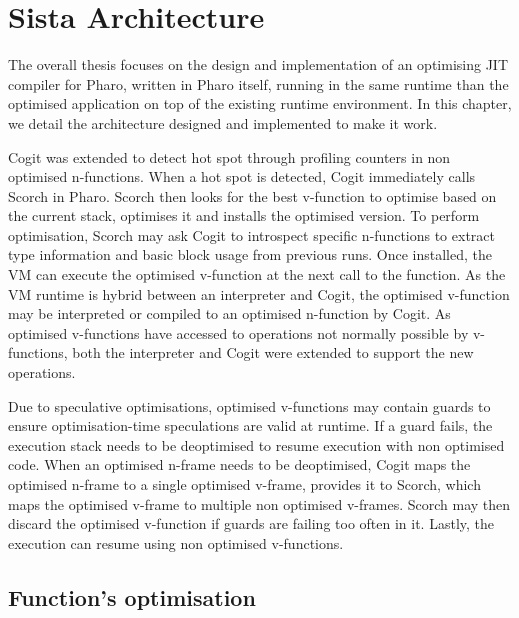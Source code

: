 \documentclass[a4paper,12pt,twoside]{../includes/ThesisStyle}
\begin{document}
\fi

\chapter{Sista Architecture}
\label{chap:architecture}
\minitoc

The overall thesis focuses on the design and implementation of an optimising JIT compiler for Pharo, written in Pharo itself, running in the same runtime than the optimised application on top of the existing runtime environment. In this chapter, we detail the architecture designed and implemented to make it work.

Cogit was extended to detect hot spot through profiling counters in non optimised n-functions. When a hot spot is detected, Cogit immediately calls Scorch in Pharo. Scorch then looks for the best v-function to optimise based on the current stack, optimises it and installs the optimised version. To perform optimisation, Scorch may ask Cogit to introspect specific n-functions to extract type information and basic block usage from previous runs. Once installed, the VM can execute the optimised v-function at the next call to the function. As the VM runtime is hybrid between an interpreter and Cogit, the optimised v-function may be interpreted or compiled to an optimised n-function by Cogit. As optimised v-functions have accessed to operations not normally possible by v-functions, both the interpreter and Cogit were extended to support the new operations.

Due to speculative optimisations, optimised v-functions may contain guards to ensure optimisation-time speculations are valid at runtime. If a guard fails, the execution stack needs to be deoptimised to resume execution with non optimised code. When an optimised n-frame needs to be deoptimised, Cogit maps the optimised n-frame to a single optimised v-frame, provides it to Scorch, which maps the optimised v-frame to multiple non optimised v-frames. Scorch may then discard the optimised v-function if guards are failing too often in it. Lastly, the execution can resume using non optimised v-functions.



\section {Function's optimisation}
\end{document}
